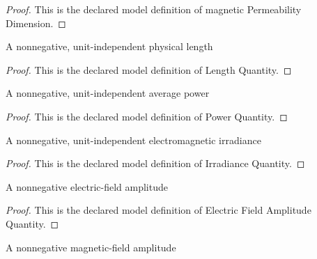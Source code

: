 \begin{proof}
  This is the declared model definition of magnetic Permeability Dimension.
\end{proof}
\begin{definition}
  \label{def:physics:phyx-mini-0944:phyxminiproblems-problemphyxmini0944-lengthquantity}
  A nonnegative, unit-independent physical length
\end{definition}
\begin{proof}
  This is the declared model definition of Length Quantity.
\end{proof}
\begin{definition}
  \label{def:physics:phyx-mini-0944:phyxminiproblems-problemphyxmini0944-powerquantity}
  A nonnegative, unit-independent average power
\end{definition}
\begin{proof}
  This is the declared model definition of Power Quantity.
\end{proof}
\begin{definition}
  \label{def:physics:phyx-mini-0944:phyxminiproblems-problemphyxmini0944-irradiancequantity}
  A nonnegative, unit-independent electromagnetic irradiance
\end{definition}
\begin{proof}
  This is the declared model definition of Irradiance Quantity.
\end{proof}
\begin{definition}
  \label{def:physics:phyx-mini-0944:phyxminiproblems-problemphyxmini0944-electricfieldamplitudequantity}
  A nonnegative electric-field amplitude
\end{definition}
\begin{proof}
  This is the declared model definition of Electric Field Amplitude Quantity.
\end{proof}
\begin{definition}
  \label{def:physics:phyx-mini-0944:phyxminiproblems-problemphyxmini0944-magneticfieldamplitudequantity}
  A nonnegative magnetic-field amplitude
\end{definition}
